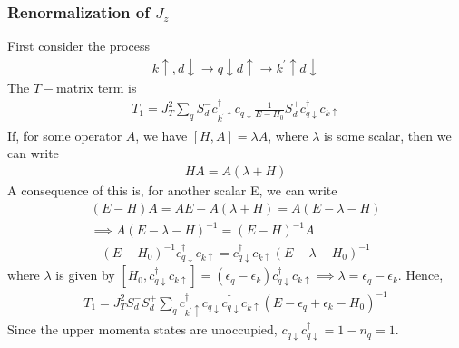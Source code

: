 \subsubsection{Renormalization of \(J_z\)}
First consider the process
\begin{equation}\begin{aligned}
k \uparrow, d\downarrow \rightarrow q \downarrow d \uparrow \rightarrow k^\prime \uparrow d\downarrow
\end{aligned}\end{equation}
The \(T-\)matrix term is
\begin{equation}\begin{aligned}
T_1 = J_T^2\sum_q S_d^- c^\dagger_{k^\prime \uparrow}c_{q\downarrow}\frac{1}{E - H_0}S_d^+ c^\dagger_{q \downarrow}c_{k\uparrow}
\end{aligned}\end{equation}
If, for some operator \(A\), we have \(\left[H,A\right] = \lambda A\), where \(\lambda\) is some scalar, then we can write
\begin{equation}\begin{aligned}
HA = A(\lambda+H)
\end{aligned}\end{equation}
A consequence of this is, for another scalar E, we can write
\begin{gather}
	(E - H)A = AE - A(\lambda+H) = A\left(E -\lambda -H\right) \\
\implies A(E - \lambda - H)^{-1} = (E-H)^{-1}A
\end{gather}
\begin{equation}\begin{aligned}
(E - H_0)^{-1} c^\dagger_{q \downarrow}c_{k\uparrow} = c^\dagger_{q \downarrow}c_{k\uparrow}(E - \lambda -H_0)^{-1}
\end{aligned}\end{equation}
where \(\lambda\) is given by \(\left[H_0,c^\dagger_{q \downarrow}c_{k\uparrow}\right] = (\epsilon_q - \epsilon_k) c^\dagger_{q \downarrow}c_{k\uparrow} \implies \lambda = \epsilon_q - \epsilon_k\).
Hence,
\begin{equation}\begin{aligned}
	T_1 = J_T^2 S_d^- S_d^+ \sum_q c^\dagger_{k^\prime \uparrow}c_{q\downarrow}c^\dagger_{q \downarrow}c_{k\uparrow}\left(E - \epsilon_q + \epsilon_k - H_0\right)^{-1}
\end{aligned}\end{equation}
Since the upper momenta states are unoccupied, \(c_{q\downarrow}c^\dagger_{q \downarrow} = 1 -n_q = 1\).

